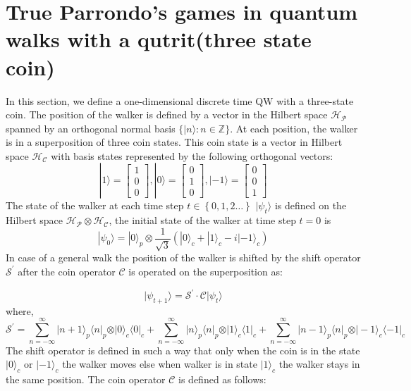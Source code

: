 \documentclass[english,aps,pra,amsmath,amssymb,showpacs,notitlepage,onecolumn]{revtex4-1}
\begin{document}
\section{True Parrondo's games in quantum walks with a qutrit(three state coin)}\label{3state}
In this section, we define a one-dimensional discrete time QW with a three-state coin. The position of the walker is defined by a vector in the Hilbert space $\mathcal{H_P}$ spanned by an orthogonal normal basis $\lbrace \vert n \rangle : n \in \mathbb{Z} \rbrace$. At each position, the walker is in a superposition of three coin states. This coin state is a vector in Hilbert space $\mathcal{H_C}$ with basis states represented by the following orthogonal vectors:
\begin{equation}
|1\rangle= \left[  \begin{array}{c}
1 \\ 
0 \\ 
0
\end{array} \right]  , |0\rangle= \left[  \begin{array}{c}
0 \\ 
1 \\ 
0
\end{array} \right]  , |-1\rangle= \left[  \begin{array}{c}
0 \\ 
0 \\ 
1
\end{array} \right]
\end{equation} 
The state of the walker at each time step $t \in \left\lbrace 0,1,2 \ldots \right\rbrace $ $| \psi_t \rangle$ is defined on the Hilbert space $\mathcal{H_P} \otimes \mathcal{H_C}$, the initial state of the walker at time step $t=0$ is 
\begin{equation}\label{initial_1}
|\psi_0 \rangle = | 0 \rangle_p \otimes \frac{1}{\sqrt{3}}(| 0 \rangle_c + | 1 \rangle_c - i| -1 \rangle_c)
\end{equation}
In case of a general walk the position of the walker is shifted by the shift operator $\mathcal{S^{\prime}}$ after the coin operator $\mathcal{C}$ is operated on the superposition as:

\begin{equation}
\vert\psi_{t+1}\rangle= \mathcal{S^{\prime}} \cdot \mathcal{C} \vert\psi_{t}\rangle
\end{equation}
where,
\begin{equation}\label{shift_3}
\mathcal{S^{\prime}} =   \sum\limits_{n=-\infty}^{\infty}\vert n+1 \rangle_p \langle n \vert_p \otimes \vert 0 \rangle_c \langle 0 \vert_c +   \sum\limits_{n=-\infty}^{\infty}\vert n \rangle_p \langle n \vert_p \otimes \vert 1 \rangle_c \langle 1 \vert_c +   \sum\limits_{n=-\infty}^{\infty}\vert n-1 \rangle_p \langle n \vert_p \otimes \vert -1 \rangle_c \langle -1 \vert_c
\end{equation}
The shift operator is defined in such a way that only when the coin is in the state $| 0 \rangle_c$ or $| -1\rangle_c $ the walker moves else when walker is in state $|1\rangle_c$ the walker stays in the same position. The coin operator $\mathcal{C}$ is defined as follows:
\end{document}
